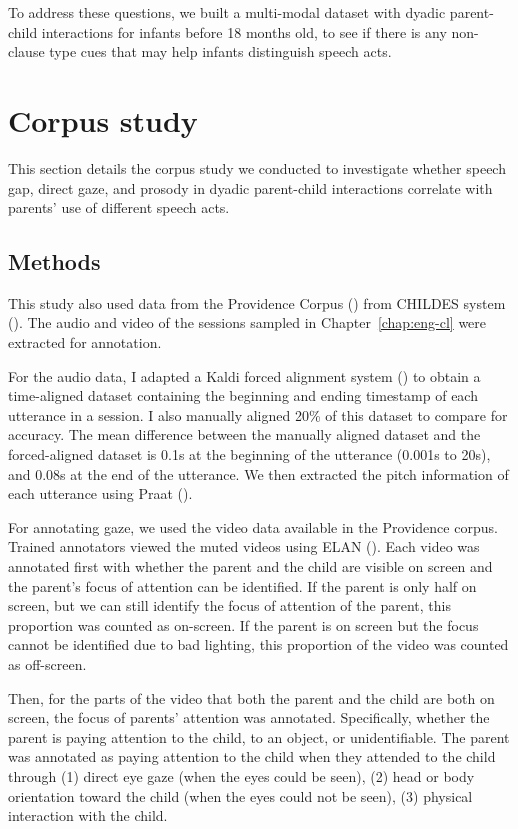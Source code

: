 To address these questions, we built a multi-modal dataset with dyadic parent-child interactions for infants before 18 months old, to see if there is any non-clause type cues that may help infants distinguish speech acts.

\section{Corpus study}
\label{sec:engsp:corpus}

This section details the corpus study we conducted to investigate whether speech gap, direct gaze, and prosody in dyadic parent-child interactions correlate with parents' use of different speech acts. 


\subsection{Methods}
\label{sec:engsp:corpus:method}
This study also used data from the Providence Corpus (\citealt{ProvidenceCorpus}) from CHILDES system (\citealt{CHILDES}). The audio and video of the sessions sampled in Chapter~\ref{chap:eng-cl} were extracted for annotation. 

For the audio data, I adapted a Kaldi forced alignment system (\cite{kaldi}) to obtain a time-aligned dataset containing the beginning and ending timestamp of each utterance in a session. I also manually aligned 20\% of this dataset to compare for accuracy. The mean difference between the manually aligned dataset and the forced-aligned dataset is 0.1s at the beginning of the utterance (0.001s to 20s), and 0.08s at the end of the utterance. We then extracted the pitch information of each utterance using Praat (\cite{praat}). 

For annotating gaze, we used the video data available in the Providence corpus. Trained annotators viewed the muted videos using ELAN (\cite{elan}). Each video was annotated first with whether the parent and the child are visible on screen and the parent's focus of attention can be identified. If the parent is only half on screen, but we can still identify the focus of attention of the parent, this proportion was counted as on-screen. If the parent is on screen but the focus cannot be identified due to bad lighting, this proportion of the video was counted as off-screen.

Then, for the parts of the video that both the parent and the child are both on screen, the focus of parents' attention was annotated. Specifically, whether the parent is paying attention to the child, to an object, or unidentifiable. The parent was annotated as paying attention to the child when they attended to the child through (1) direct eye gaze (when the eyes could be seen), (2) head or body orientation toward the child (when the eyes could not be seen), (3) physical interaction with the child.  

